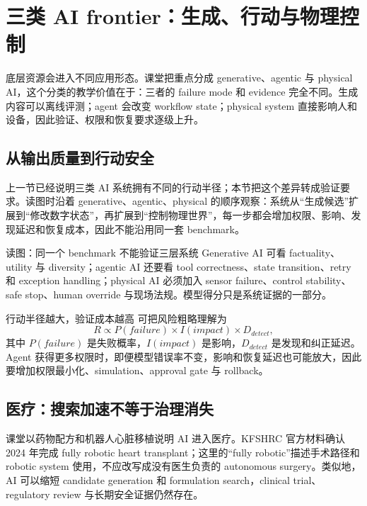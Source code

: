 \section{三类 AI frontier：生成、行动与物理控制}

底层资源会进入不同应用形态。课堂把重点分成 generative、agentic 与 physical AI，这个分类的教学价值在于：三者的 failure mode 和 evidence 完全不同。生成内容可以离线评测；agent 会改变 workflow state；physical system 直接影响人和设备，因此验证、权限和恢复要求逐级上升。

\subsection{从输出质量到行动安全}

上一节已经说明三类 AI 系统拥有不同的行动半径；本节把这个差异转成验证要求。读图时沿着 generative、agentic、physical 的顺序观察：系统从“生成候选”扩展到“修改数字状态”，再扩展到“控制物理世界”，每一步都会增加权限、影响、发现延迟和恢复成本，因此不能沿用同一套 benchmark。


\begin{knowledgebox}{读图：同一个 benchmark 不能验证三层系统}
Generative AI 可看 factuality、utility 与 diversity；agentic AI 还要看 tool correctness、state transition、retry 和 exception handling；physical AI 必须加入 sensor failure、control stability、safe stop、human override 与现场法规。模型得分只是系统证据的一部分。
\end{knowledgebox}

\begin{importantbox}{行动半径越大，验证成本越高}
可把风险粗略理解为
\[
R \propto P(failure)\times I(impact)\times D_{detect},
\]
其中 $P(failure)$ 是失败概率，$I(impact)$ 是影响，$D_{detect}$ 是发现和纠正延迟。Agent 获得更多权限时，即便模型错误率不变，影响和恢复延迟也可能放大，因此要增加权限最小化、simulation、approval gate 与 rollback。
\end{importantbox}

\subsection{医疗：搜索加速不等于治理消失}

课堂以药物配方和机器人心脏移植说明 AI 进入医疗。KFSHRC 官方材料确认 2024 年完成 fully robotic heart transplant；这里的“fully robotic”描述手术路径和 robotic system 使用，不应改写成没有医生负责的 autonomous surgery。类似地，AI 可以缩短 candidate generation 和 formulation search，clinical trial、regulatory review 与长期安全证据仍然存在。

